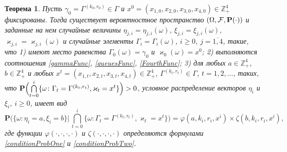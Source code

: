 \documentclass[12pt]{extarticle}
\theoremstyle{theorem}
\newtheorem{theorem}{Теорема}
\theoremstyle{remark}
\renewcommand{\Pr}{{\mathbf P}}
\begin{document}
\begin{theorem}
Пусть $\gamma_0=\Gamma^{(k_0,r_0)}\in \Gamma$ и $x^0=(x_{1,0},x_{2,0}, x_{3,0},x_{4,0})\in \mathbb{Z}_+^4$ фиксированы.
Тогда существует вероятностное пространство $(\Omega, {\cal F}, \Pr(\cdot))$ и заданные на нем случайные величины $\eta_{j,i}=\eta_{j,i}(\omega)$, $\xi_{j,i}=\xi_{j,i}(\omega)$, 	 $\varkappa_{j,i}=\varkappa_{j,i}(\omega)$ и случайные элементы $\Gamma_i=\Gamma_i(\omega)$, $i\geqslant 0$, $j= \overline{1,4}$, такие, что 1) имеют место равенства $\Gamma_0(\omega) = \gamma_0$ и $\varkappa_0(\omega)=x^0$; 2) выполняются соотношения \eqref{gammaFunc}, \eqref{queuesFunc}, \eqref{FourthFunc}; 3) для любых  $a\in \mathbb{Z}_+^4$, $b\in \mathbb{Z}_+^4$ и любых $x^t=(x_{1,t},x_{2,t},x_{3,t},x_{4,t}) \in \mathbb{Z}_+^4$, $\Gamma^{(k_t,r_t)} \in \Gamma$, $t = 1, 2, \ldots$, таких, что $\Pr\Bigl(\bigcap\limits_{t=0}^{i}\{\omega\colon \Gamma_t=\Gamma^{(k_t,r_t)}, \varkappa_t=x^t\}\Bigr)>0$, условное распределение векторов $\eta_i$ и $\xi_i$, $i \geqslant 0$,  имеет вид
\begin{equation}
\Pr \biggl(\{ \omega \colon \eta_i = a, \xi_i=b\} \bigg
|\,\bigcap_{t=0}^{i}\{\omega\colon \Gamma_t=\Gamma^{(k_t,r_t)}, \varkappa_t=x^t\}\biggr)=
\varphi(a,k_i,r_i,x^i)\times \zeta(b,k_i,r_i,x^i),
\label{ProbablititiesToProve}
\end{equation}
где функции $\varphi(\cdot, \cdot, \cdot, \cdot)$ и $\zeta(\cdot, \cdot, \cdot, \cdot)$ определяются формулами \eqref{conditionProbOne} и \eqref{conditionProbTwo}.

\label{myTheorem}
\end{theorem}
\end{document}
